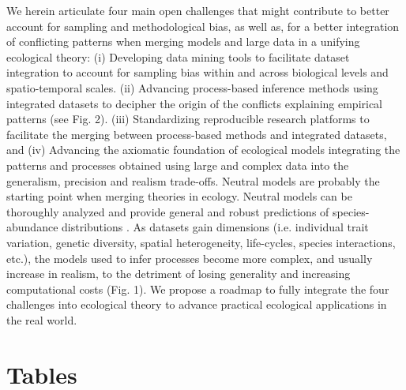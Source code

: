 \documentclass[12pt,a4paper]{article}
\begin{document}
We herein articulate four main open challenges that might contribute
to better account for sampling and methodological bias, as well as,
for a better integration of conflicting patterns when merging models
and large data in a unifying ecological theory: (i) Developing data
mining tools to facilitate dataset integration to account for sampling
bias within and across biological levels and spatio-temporal scales.
(ii) Advancing process-based inference methods using integrated
datasets to decipher the origin of the conflicts explaining empirical
patterns (see Fig. 2).  (iii) Standardizing reproducible research
platforms to facilitate the merging between process-based methods and
integrated datasets, and (iv) Advancing the axiomatic foundation of
ecological models integrating the patterns and processes obtained
using large and complex data into the generalism, precision and
realism trade-offs.  Neutral models are probably the starting point
when merging theories in ecology. Neutral models can be thoroughly
analyzed and provide general and robust predictions of
species-abundance distributions \citep{Matthews and Whittaker, 2014;
  May et al. 2015}. As datasets gain dimensions (i.e. individual trait
variation, genetic diversity, spatial heterogeneity, life-cycles,
species interactions, etc.), the models used to infer processes become
more complex, and usually increase in realism, to the detriment of
losing generality and increasing computational costs (Fig. 1). We
propose a roadmap to fully integrate the four challenges into
ecological theory to advance practical ecological applications in the
real world.

\section{Tables}
\end{document}
